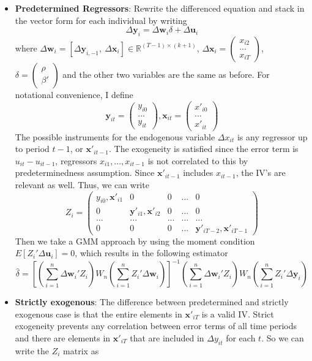 \documentclass[12pt]{article}
\theoremstyle{definition}
\theoremstyle{property}
\theoremstyle{assumption}
\theoremstyle{example}
\theoremstyle{comment}
\begin{document}
\begin{itemize}
\item \textbf{Predetermined Regressors}: Rewrite the differenced equation and stack in the vector form for each individual by writing
\[
\Delta \mathbf{y}_i=\Delta \mathbf{w}_i\delta + \Delta \mathbf{u}_i
\]
where $\Delta \mathbf{w}_i=[\Delta \mathbf{y}_{i,-1},\ \Delta \mathbf{x}_i ]\in\mathbb{R}^{(T-1)\times (k+1)}$, $\Delta \mathbf{x}_i=\begin{pmatrix} x_{i2} \\ ... \\x_{iT}\end{pmatrix}$, $\delta=\begin{pmatrix}\rho \\ \beta'\end{pmatrix}$ and the other two variables are the same as before. For notational convenience, I define
\[
\mathbf{y}_{it}=\begin{pmatrix}y_{i0}\\ ... \\ y_{it} \end{pmatrix},\mathbf{x}_{it}=\begin{pmatrix}x'_{i0}\\ ... \\ x'_{it} \end{pmatrix}
\]
The possible instruments for the endogenous variable $\Delta x_{it}$ is any regressor up to period $t-1$, or $\mathbf{x}'_{it-1}$. The exogeneity is satisfied since the error term is $u_{it}-u_{it-1}$, regressors $x_{i1},...,x_{it-1}$ is not correlated to this by predeterminedness assumption. Since $\mathbf{x}'_{it-1}$ includes $x_{it-1}$, the IV's are relevant as well.  Thus, we can write
\[
Z_i = \begin{pmatrix}y_{i0}, \mathbf{x}'_{i1}& 0 &0 &...& 0\\ 0 & \mathbf{y}'_{i1},\mathbf{x}'_{i2} & 0 & ... & 0 \\ ...&...&...&...&...\\ 0 & 0& 0& ... & \mathbf{y}'_{iT-2},\mathbf{x}'_{iT-1}\end{pmatrix}
\]
 Then we take a GMM approach by using the moment condition $E[Z_i'\Delta\mathbf{u}_i]=0$, which results in the following estimator
\[
\hat{\delta}=\left[\left(\sum_{i=1}^n\Delta \mathbf{w}_{i}' Z_i\right)W_n\left(\sum_{i=1}^n Z_i' \Delta \mathbf{w}_{i}\right) \right]^{-1}\left(\sum_{i=1}^n\Delta \mathbf{w}_{i}' Z_i\right)W_n\left(\sum_{i=1}^n Z_i' \Delta \mathbf{y}_i \right)
\]
\item \textbf{Strictly exogenous}: The difference between predetermined and strictly exogenous case is that the entire elements in $\mathbf{x}'_{iT}$ is a valid IV. Strict exogeneity prevents any correlation between error terms of all time periods and there are elements in $\mathbf{x}'_{iT}$ that are included in $\Delta y_{it}$ for each $t$. So we can write the $Z_i$ matrix as

\end{itemize}
\end{document}
